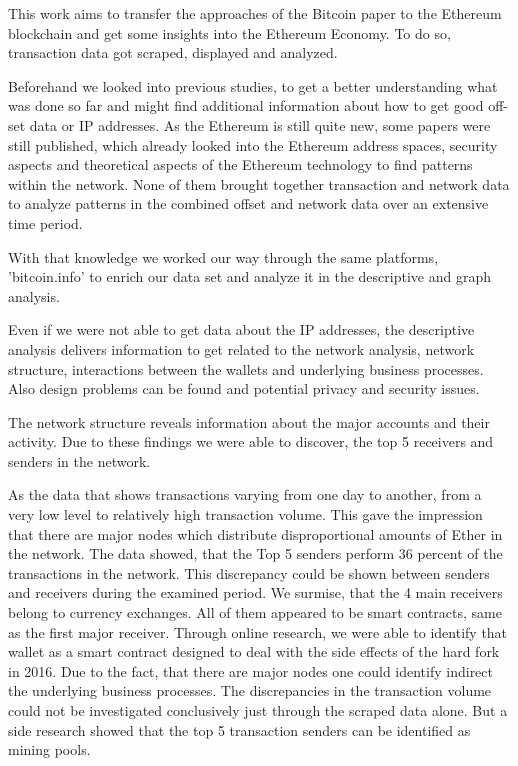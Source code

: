 This work aims to transfer the approaches of the Bitcoin paper \cite{lischke2016analyzing} to the Ethereum blockchain and get some insights into the Ethereum Economy. 
To do so, transaction data got scraped, displayed and analyzed.

Beforehand we looked into previous studies, to get a better understanding what was done so far and might find additional information about how to get good off-set data or IP addresses.
As the Ethereum is still quite new, some papers were still published, which already looked into the Ethereum address spaces, security aspects and theoretical aspects of the Ethereum technology to find patterns within the network.
None of them brought together transaction and network data to analyze patterns in the combined offset and network data over an extensive time period.

With that knowledge we worked our way through the same platforms, 'bitcoin.info' to enrich our data set and analyze it in the descriptive and graph analysis.

Even if we were not able to get data about the IP addresses, the descriptive analysis delivers information to get related to the network analysis, network structure, interactions between the wallets and underlying business processes.
Also design problems can be found and potential privacy and security issues.

The network structure reveals information about the major accounts and their activity. 
Due to these findings we were able to discover, the top 5 receivers and senders in the network.

As the data that shows transactions varying from one day to another, from a very low level to relatively high transaction volume.
This gave the impression that there are major nodes which distribute disproportional amounts of Ether in the network. 
The data showed, that the Top 5 senders perform 36 percent of the transactions in the network. 
This discrepancy could be shown between senders and receivers during the examined period. 
We surmise, that the 4 main receivers belong to currency exchanges. 
All of them appeared to be smart contracts, same as the first major receiver. 
Through online research, we were able to identify that wallet as a smart contract designed to deal with the side effects of the hard fork in 2016.
Due to the fact, that there are major nodes one could identify indirect the underlying business processes. 
The discrepancies in the transaction volume could not be investigated conclusively just through the scraped data alone. 
But a side research showed that the top 5 transaction senders can be identified as mining pools.

